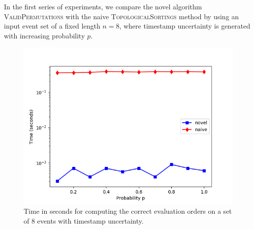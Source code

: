 In the first series of experiments, we compare the novel algorithm \textsc{ValidPermutations} with the naive \textsc{TopologicalSortings} method by using an input event set of a fixed length $n=8$, where timestamp uncertainty is generated with increasing probability $p$.
%
%
%
\begin{figure}
	\centering
	\includegraphics[width=0.8\columnwidth]{figures/n_fixed_8_logscale.png}
	\caption{Time in seconds for computing the correct evaluation orders on a set of 8 events with timestamp uncertainty.}
	\label{fig: series1}
\end{figure}
%
%
%

